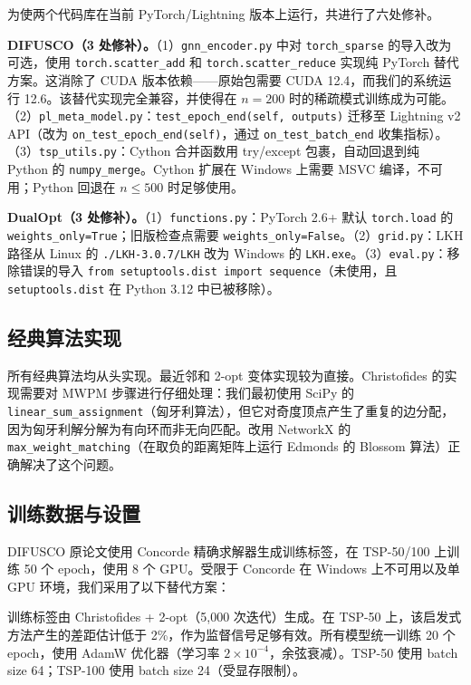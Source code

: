 \documentclass[11pt,a4paper]{ctexart}
\begin{document}
为使两个代码库在当前 PyTorch/Lightning 版本上运行，共进行了六处修补。

\textbf{DIFUSCO（3 处修补）。}（1）\texttt{gnn\_encoder.py} 中对 \texttt{torch\_sparse} 的导入改为可选，使用 \texttt{torch.scatter\_add} 和 \texttt{torch.scatter\_reduce} 实现纯 PyTorch 替代方案。这消除了 CUDA 版本依赖——原始包需要 CUDA 12.4，而我们的系统运行 12.6。该替代实现完全兼容，并使得在 $n=200$ 时的稀疏模式训练成为可能。（2）\texttt{pl\_meta\_model.py}：\texttt{test\_epoch\_end(self, outputs)} 迁移至 Lightning v2 API（改为 \texttt{on\_test\_epoch\_end(self)}，通过 \texttt{on\_test\_batch\_end} 收集指标）。（3）\texttt{tsp\_utils.py}：Cython 合并函数用 try/except 包裹，自动回退到纯 Python 的 \texttt{numpy\_merge}。Cython 扩展在 Windows 上需要 MSVC 编译，不可用；Python 回退在 $n \leq 500$ 时足够使用。

\textbf{DualOpt（3 处修补）。}（1）\texttt{functions.py}：PyTorch 2.6+ 默认 \texttt{torch.load} 的 \texttt{weights\_only=True}；旧版检查点需要 \texttt{weights\_only=False}。（2）\texttt{grid.py}：LKH 路径从 Linux 的 \texttt{./LKH-3.0.7/LKH} 改为 Windows 的 \texttt{LKH.exe}。（3）\texttt{eval.py}：移除错误的导入 \texttt{from setuptools.dist import sequence}（未使用，且 \texttt{setuptools.dist} 在 Python 3.12 中已被移除）。

\subsection{经典算法实现}

所有经典算法均从头实现。最近邻和 2-opt 变体实现较为直接。Christofides 的实现需要对 MWPM 步骤进行仔细处理：我们最初使用 SciPy 的 \texttt{linear\_sum\_assignment}（匈牙利算法），但它对奇度顶点产生了重复的边分配，因为匈牙利解分解为有向环而非无向匹配。改用 NetworkX 的 \texttt{max\_weight\_matching}（在取负的距离矩阵上运行 Edmonds 的 Blossom 算法）正确解决了这个问题。

\subsection{训练数据与设置}

DIFUSCO 原论文使用 Concorde 精确求解器生成训练标签，在 TSP-50/100 上训练 50 个 epoch，使用 8 个 GPU。受限于 Concorde 在 Windows 上不可用以及单 GPU 环境，我们采用了以下替代方案：

训练标签由 Christofides + 2-opt（5,000 次迭代）生成。在 TSP-50 上，该启发式方法产生的差距估计低于 2\%，作为监督信号足够有效。所有模型统一训练 20 个 epoch，使用 AdamW 优化器（学习率 $2\times10^{-4}$，余弦衰减）。TSP-50 使用 batch size 64；TSP-100 使用 batch size 24（受显存限制）。
\end{document}
